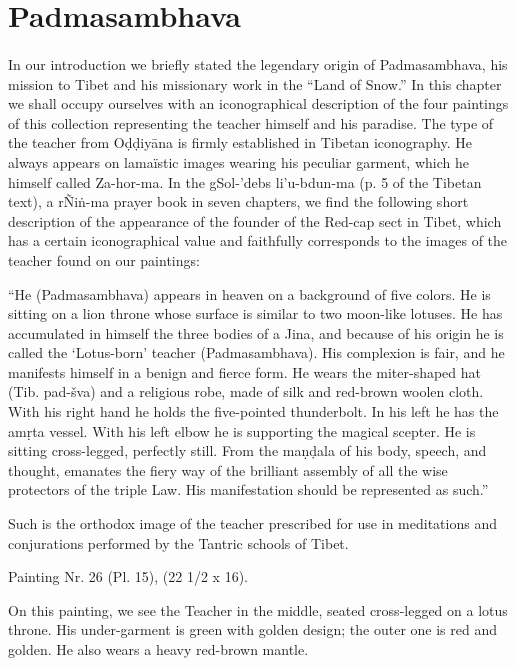 \documentclass[a4paper, 12pt, oneside]{article}
\begin{document}
\section{Padmasambhava}
\paragraph{}
In our introduction we briefly stated the legendary origin of Padmasambhava, his mission to Tibet and his missionary work in the ``Land of Snow.'' In this chapter we shall occupy ourselves with an iconographical description of the four paintings of this collection representing the teacher himself and his paradise. The type of the teacher from O\d{d}\d{d}iy\={a}na is firmly established in Tibetan iconography. He always appears on lamaïstic images wearing his peculiar garment, which he himself called Za-hor-ma. In the gSol-'debs li'u-bdun-ma (p. 5 of the Tibetan text), a rÑi\.{n}-ma prayer book in seven chapters, we find the following short description of the appearance of the founder of the Red-cap sect in Tibet, which has a certain iconographical value and faithfully corresponds to the images of the teacher found on our paintings:

``He (Padmasambhava) appears in heaven on a background of five colors. He is sitting on a lion throne whose surface is similar to two moon-like lotuses. He has accumulated in himself the three bodies of a Jina, and because of his origin he is called the `Lotus-born' teacher (Padmasambhava). His complexion is fair, and he manifests himself in a benign and fierce form. He wears the miter-shaped hat (Tib. pad-šva) and a religious robe, made of silk and red-brown woolen cloth. With his right hand he holds the five-pointed thunderbolt. In his left he has the am\d{r}ta vessel. With his left elbow he is supporting the magical scepter. He is sitting cross-legged, perfectly still. From the ma\d{n}\d{d}ala of his body, speech, and thought, emanates the fiery way of the brilliant assembly of all the wise protectors of the triple Law. His manifestation should be represented as such.''

Such is the orthodox image of the teacher prescribed for use in meditations and conjurations performed by the Tantric schools of Tibet.

\bigskip

Painting Nr. 26 (Pl. 15), (22 1/2 x 16).

\bigskip

On this painting, we see the Teacher in the middle, seated cross-legged on a lotus throne. His under-garment is green with golden design; the outer one is red and golden. He also wears a heavy red-brown mantle.
\end{document}
